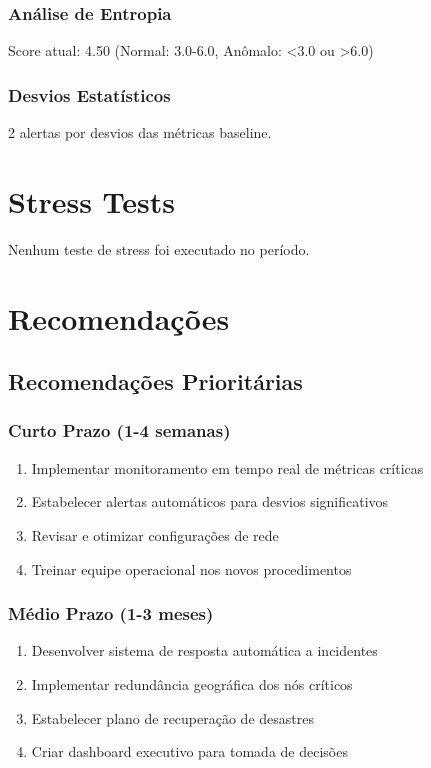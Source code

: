 \documentclass[12pt,a4paper]{report}
\begin{document}
\subsection{Análise de Entropia}
Score atual: 4.50 
(Normal: 3.0-6.0, Anômalo: <3.0 ou >6.0)

\subsection{Desvios Estatísticos}
2 alertas por desvios das métricas baseline.


\chapter{Stress Tests}

Nenhum teste de stress foi executado no período.

\chapter{Recomendações}


\section{Recomendações Prioritárias}

\subsection{Curto Prazo (1-4 semanas)}
\begin{enumerate}
\item Implementar monitoramento em tempo real de métricas críticas
\item Estabelecer alertas automáticos para desvios significativos
\item Revisar e otimizar configurações de rede
\item Treinar equipe operacional nos novos procedimentos
\end{enumerate}

\subsection{Médio Prazo (1-3 meses)}
\begin{enumerate}
\item Desenvolver sistema de resposta automática a incidentes
\item Implementar redundância geográfica dos nós críticos
\item Estabelecer plano de recuperação de desastres
\item Criar dashboard executivo para tomada de decisões
\end{enumerate}
\end{document}
